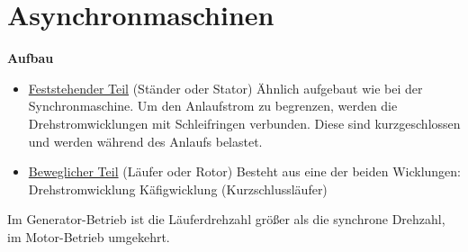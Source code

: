 \section{Asynchronmaschinen}


\textbf{Aufbau}

\begin{itemize}
    \item \underline{Feststehender Teil} (Ständer oder Stator)
    \newline Ähnlich aufgebaut wie bei der Synchronmaschine.
    \newline Um den Anlaufstrom zu begrenzen, werden die Drehstromwicklungen mit Schleifringen verbunden. Diese sind kurzgeschlossen und werden während des Anlaufs belastet.
    \item \underline{Beweglicher Teil} (Läufer oder Rotor)
    \newline Besteht aus eine der beiden Wicklungen:
    \subitem Drehstromwicklung
    \subitem Käfigwicklung (Kurzschlussläufer)
\end{itemize}

Im Generator-Betrieb ist die Läuferdrehzahl größer als die synchrone Drehzahl, im Motor-Betrieb umgekehrt.